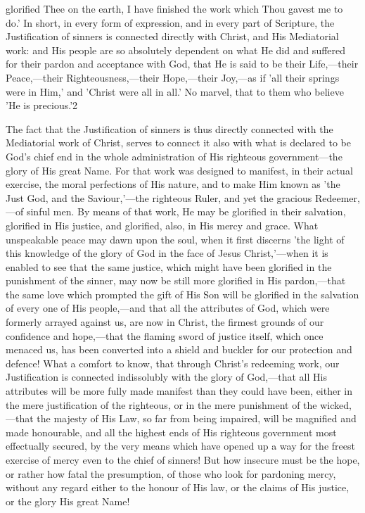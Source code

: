 \documentclass[
]{book}
\begin{document}
glorified Thee on the earth, I have finished the work which Thou gavest me to do.' In short, in every form of expression, and in every part of Scripture, the Justification of sinners is connected directly with Christ, and His Mediatorial work: and His people are so absolutely dependent on what He did and suffered for their pardon and acceptance with God, that He is said to be their Life,---their Peace,---their Righteousness,---their Hope,---their Joy,---as if 'all their springs were in Him,' and 'Christ were all in all.' No marvel, that to them who believe 'He is precious.'2

The fact that the Justification of sinners is thus directly connected with the Mediatorial work of Christ, serves to connect it also with what is declared to be God's chief end in the whole administration of His righteous government---the glory of His great Name. For that work was designed to manifest, in their actual exercise, the moral perfections of His nature, and to make Him known as 'the Just God, and the Saviour,'---the righteous Ruler, and yet the gracious Redeemer,---of sinful men. By means of that work, He may be glorified in their salvation, glorified in His justice, and glorified, also, in His mercy and grace. What unspeakable peace may dawn upon the soul, when it first discerns 'the light of this knowledge of the glory of God in the face of Jesus Christ,'---when it is enabled to see that the same justice, which might have been glorified in the punishment of the sinner, may now be still more glorified in His pardon,---that the same love which prompted the gift of His Son will be glorified in the salvation of every one of His people,---and that all the attributes of God, which were formerly arrayed against us, are now in Christ, the firmest grounds of our confidence and hope,---that the flaming sword of justice itself, which once menaced us, has been converted into a shield and buckler for our protection and defence! What a comfort to know, that through Christ's redeeming work, our Justification is connected indissolubly with the glory of God,---that all His attributes will be more fully made manifest than they could have been, either in the mere justification of the righteous, or in the mere punishment of the wicked,---that the majesty of His Law, so far from being impaired, will be magnified and made honourable, and all the highest ends of His righteous government most effectually secured, by the very means which have opened up a way for the freest exercise of mercy even to the chief of sinners! But how insecure must be the hope, or rather how fatal the presumption, of those who look for pardoning mercy, without any regard either to the honour of His law, or the claims of His justice, or the glory His great Name!
\end{document}
